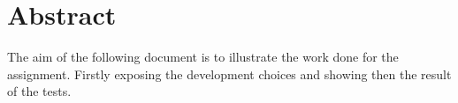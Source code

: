 \section{Abstract}
The aim of the following document is to illustrate the work done for the assignment. Firstly exposing the development choices and showing then the result of the tests. 


